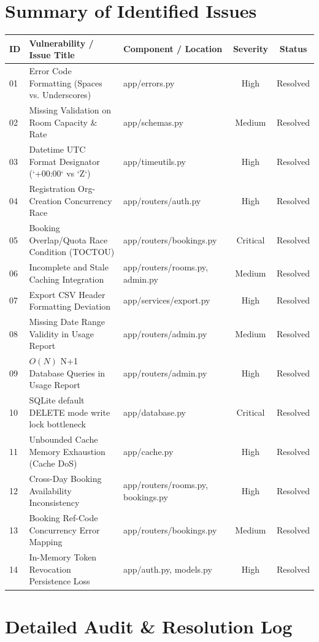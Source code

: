 \documentclass[11pt,a4paper]{article}
\begin{document}
\section{Summary of Identified Issues}
\begin{longtable}{lllcc}
\toprule
\textbf{ID} & \textbf{Vulnerability / Issue Title} & \textbf{Component / Location} & \textbf{Severity} & \textbf{Status} \\
\midrule
01 & Error Code Formatting (Spaces vs. Underscores) & app/errors.py & High & Resolved \\
02 & Missing Validation on Room Capacity \& Rate & app/schemas.py & Medium & Resolved \\
03 & Datetime UTC Format Designator (`+00:00` vs `Z`) & app/timeutils.py & High & Resolved \\
04 & Registration Org-Creation Concurrency Race & app/routers/auth.py & High & Resolved \\
05 & Booking Overlap/Quota Race Condition (TOCTOU) & app/routers/bookings.py & Critical & Resolved \\
06 & Incomplete and Stale Caching Integration & app/routers/rooms.py, admin.py & Medium & Resolved \\
07 & Export CSV Header Formatting Deviation & app/services/export.py & High & Resolved \\
08 & Missing Date Range Validity in Usage Report & app/routers/admin.py & Medium & Resolved \\
09 & $O(N)$ N+1 Database Queries in Usage Report & app/routers/admin.py & High & Resolved \\
10 & SQLite default DELETE mode write lock bottleneck & app/database.py & Critical & Resolved \\
11 & Unbounded Cache Memory Exhaustion (Cache DoS) & app/cache.py & High & Resolved \\
12 & Cross-Day Booking Availability Inconsistency & app/routers/rooms.py, bookings.py & High & Resolved \\
13 & Booking Ref-Code Concurrency Error Mapping & app/routers/bookings.py & Medium & Resolved \\
14 & In-Memory Token Revocation Persistence Loss & app/auth.py, models.py & High & Resolved \\
\bottomrule
\end{longtable}

\newpage
\section{Detailed Audit \& Resolution Log}
\end{document}
